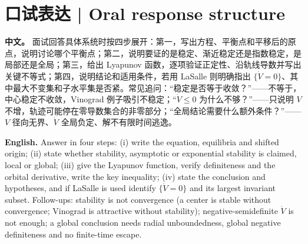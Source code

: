 \documentclass[UTF8,11pt,a4paper]{ctexart}
\newcommand{\APS}[2]{\par\noindent\textbf{中文。} #1\par\noindent\textbf{English.} #2\par}
\begin{document}
\section*{口试表达 | Oral response structure}
\APS{面试回答具体系统时按四步展开：第一，写出方程、平衡点和平移后的原点，说明讨论哪个平衡点；第二，说明要证的是稳定、渐近稳定还是指数稳定，是局部还是全局；第三，给出 Lyapunov 函数，逐项验证正定性、沿轨线导数并写出关键不等式；第四，说明结论和适用条件，若用 LaSalle 则明确指出 $\{\dot V=0\}$、其中最大不变集和子水平集是否紧。常见追问：“稳定是否等于收敛？”——不等于，中心稳定不收敛，Vinograd 例子吸引不稳定；“$\dot V\le0$ 为什么不够？”——只说明 $V$ 不增，轨迹可能停在零导数集合的非零部分；“全局结论需要什么额外条件？”——$V$ 径向无界、$\dot V$ 全局负定、解不有限时间逃逸。}{Answer in four steps: (i) write the equation, equilibria and shifted origin; (ii) state whether stability, asymptotic or exponential stability is claimed, local or global; (iii) give the Lyapunov function, verify definiteness and the orbital derivative, write the key inequality; (iv) state the conclusion and hypotheses, and if LaSalle is used identify $\{\dot V=0\}$ and its largest invariant subset. Follow-ups: stability is not convergence (a center is stable without convergence; Vinograd is attractive without stability); negative-semidefinite $\dot V$ is not enough; a global conclusion needs radial unboundedness, global negative definiteness and no finite-time escape.}
\end{document}
